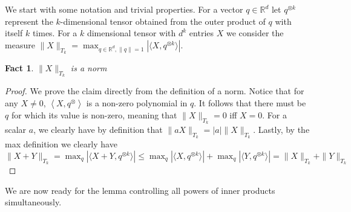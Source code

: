 \documentclass[anon,12pt]{colt2019} %
\newtheorem{fact}[theorem]{Fact}
\newcommand{\ip}[1]{\left \langle #1 \right \rangle}
\newcommand{\R}{\mathbb{R}}
\begin{document}
We start with some notation and trivial properties. 
For a vector $q \in \R^d$ let $q^{\otimes k}$ represent the $k$-dimensional tensor obtained from the outer product of $q$ with itself $k$ times. For a $k$ dimensional tensor with $d^k$ entries $X$ we consider the measure
$\|X\|_{T_k} = \max_{q \in \R^d, \|q\|=1} \left| \langle X, q^{\otimes k}\rangle \right|$.
\begin{fact}
$\|X\|_{T_k}$ is a norm
\end{fact}
\begin{proof}
We prove the claim directly from the definition of a norm.
Notice that for any $X \neq 0$, $\ip{X, q^{\otimes}}$ is a non-zero polynomial in $q$. It follows that there must be $q$ for which its value is non-zero, meaning that $\|X\|_{T_k}=0$ iff $X=0$. For a scalar $a$, we clearly have by definition that
$\|aX\|_{T_k} = |a|\|X\|_{T_k}$.  Lastly, by the max definition we clearly have
$ \|X+Y\|_{T_k} =  \max_q \left| \langle X+Y, q^{\otimes k}\rangle \right| \leq 
\max_q \left| \langle X, q^{\otimes k}\rangle \right| + \max_q\left| \langle Y, q^{\otimes k}\rangle \right| = \|X\|_{T_k} + \|Y\|_{T_k}$
\end{proof}



We are now ready for the lemma controlling all powers of inner products simultaneously. 
\end{document}
